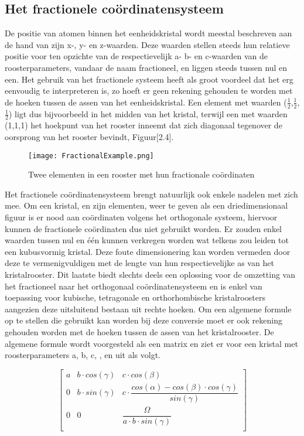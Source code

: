 \subsection{Het fractionele coördinatensysteem}
De positie van atomen binnen het eenheidskristal wordt meestal beschreven aan de hand van zijn x-, y- en z-waarden. Deze waarden stellen steeds hun relatieve positie voor ten opzichte van de respectievelijk a- b- en c-waarden van de roosterparameters, vandaar de naam fractioneel, en liggen steeds tussen nul en een. Het gebruik van het fractionele systeem heeft als groot voordeel dat het erg eenvoudig te interpreteren is, zo hoeft er geen rekening gehouden te worden met de hoeken tussen de assen van het eenheidskristal. Een element met waarden ($\frac{1}{2}$,$\frac{1}{2}$,$\frac{1}{2}$) ligt dus bijvoorbeeld in het midden van het kristal, terwijl een met waarden (1,1,1) het hoekpunt van het rooster inneemt dat zich diagonaal tegenover de oorsprong van het rooster bevindt, Figuur[2.4].
\par
\begin{figure}[H]
\texttt{[image: FractionalExample.png]}
\caption{Twee elementen in een rooster met hun fractionale coördinaten}
\end{figure}
\par
Het fractionele coördinatensysteem brengt natuurlijk ook enkele nadelen met zich mee. Om een kristal, en zijn elementen, weer te geven als een driedimensionaal figuur is er nood aan coördinaten volgens het orthogonale systeem, hiervoor kunnen de fractionele coördinaten dus niet gebruikt worden. Er zouden enkel waarden tussen nul en één kunnen verkregen worden wat telkens zou leiden tot een kubusvormig kristal. Deze foute dimensionering kan worden vermeden door deze te vermenigvuldigen met de lengte van hun respectievelijke as van het kristalrooster. Dit laatste biedt slechts deels een oplossing voor de omzetting van het fractioneel naar het orthogonaal coördinatensysteem en is enkel van toepassing voor kubische, tetragonale en orthorhombische kristalroosters aangezien deze uitsluitend bestaan uit rechte hoeken. Om een algemene formule op te stellen die gebruikt kan worden bij deze conversie moet er ook rekening gehouden worden met de hoeken tussen de assen van het kristalrooster. De algemene formule wordt voorgesteld als een matrix en ziet er voor een kristal met roosterparameters a, b, c, \textalpha, \textbeta{} en \textgamma{} uit als volgt. 
\par
\[
\begin{bmatrix}
    a & b \cdot cos(\gamma) & c \cdot cos(\beta) \\
    0 & b \cdot sin(\gamma) & c \cdot \dfrac{cos(\alpha)-cos(\beta) \cdot cos(\gamma)}{sin(\gamma)}  \\
    0 & 0 & \dfrac{\Omega}{a \cdot b \cdot sin(\gamma)}\\
\end{bmatrix}
\]

